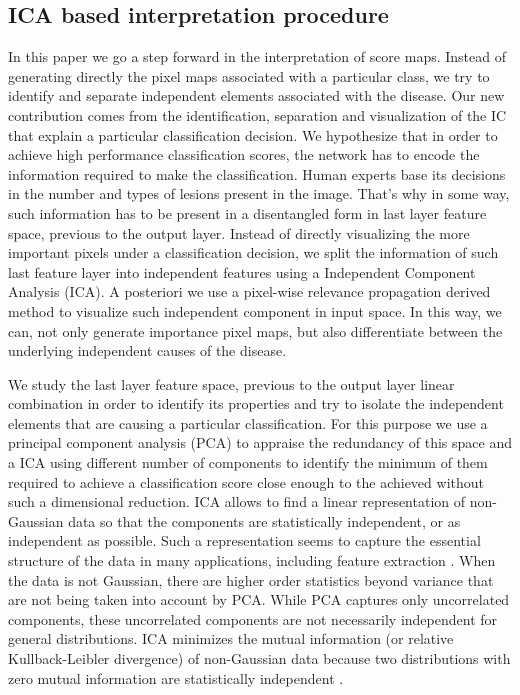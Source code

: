 \documentclass[review]{elsarticle}
\theoremstyle{definition} %
\theoremstyle{remark}
\begin{document}
\subsection{ICA based interpretation procedure}

In this paper we go a step forward in the interpretation of score maps. Instead of generating directly the pixel maps associated with a particular class, we try to identify and separate independent elements associated with the disease. Our new contribution comes from the identification, separation and visualization of the IC that explain a particular classification decision. We hypothesize that in order to achieve high performance classification scores, the network has to encode the information required to make the classification. Human experts base its decisions in the number and types of lesions present in the image. That's why in some way, such information has to be present in a disentangled form in last layer feature space, previous to the output layer.  Instead of directly visualizing the more important pixels under a classification decision, we split the information of such last feature layer into independent features using a Independent Component Analysis (ICA). A posteriori we use a pixel-wise relevance propagation derived method to visualize such independent component in input space. In this way, we can, not only generate importance pixel maps, but also differentiate between the underlying independent causes of the disease.

We study the last layer feature space, previous to the output layer linear combination in order to identify its properties and try to isolate the independent elements that are causing a particular classification. For this purpose we use a principal component analysis (PCA)  \cite{pearson1901principal} to appraise the redundancy of this space and a ICA \cite{hyvarinen2000independent} using different number of components to identify the minimum of them required to achieve a classification score close enough to the achieved without such a dimensional reduction.  ICA allows to find a linear representation of non-Gaussian data so that the components are statistically independent, or as independent as possible. Such a representation seems to capture the essential structure of the data in many applications, including feature extraction \cite{hyvarinen2000independent}. When the data is not Gaussian, there are higher order statistics beyond variance that are not being taken into account by PCA. While PCA captures only uncorrelated components, these uncorrelated components are not necessarily independent for general distributions. ICA minimizes the mutual information (or relative Kullback-Leibler divergence) of non-Gaussian data because two distributions with zero mutual information are statistically independent \cite{comon1992independent}. 
\end{document}
